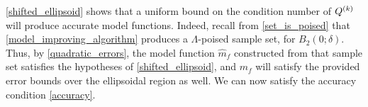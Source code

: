 \cref{shifted_ellipsoid} shows that a uniform bound on the condition number of ${Q^{(k)}}$ will produce accurate model functions.
Indeed, recall from \cref{set_is_poised} that \cref{model_improving_algorithm} produces a $\Lambda$-poised sample set, for $B_2(0;\delta)$.
Thus, by \cref{quadratic_errors},
the model function $\hat{m}_f$ constructed from that sample set
satisfies the hypotheses of \cref{shifted_ellipsoid},
and $m_f$ will satisfy the provided error bounds over the ellipsoidal region as well.
We can now satisfy the accuracy condition \cref{accuracy}.








%



